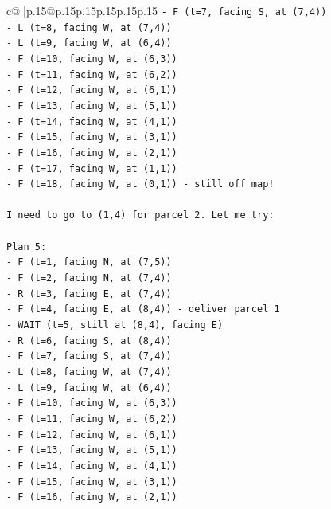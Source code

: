 \documentclass{article}
\begin{document}
{\begin{supertabular}{c@{$\;$}|p{.15\linewidth}@{}p{.15\linewidth}p{.15\linewidth}p{.15\linewidth}p{.15\linewidth}p{.15\linewidth}}
{{{\texttt{{-} F (t=7, facing S, at (7,4))} \\
\texttt{{-} L (t=8, facing W, at (7,4))} \\
\texttt{{-} L (t=9, facing W, at (6,4))} \\
\texttt{{-} F (t=10, facing W, at (6,3))} \\
\texttt{{-} F (t=11, facing W, at (6,2))} \\
\texttt{{-} F (t=12, facing W, at (6,1))} \\
\texttt{{-} F (t=13, facing W, at (5,1))} \\
\texttt{{-} F (t=14, facing W, at (4,1))} \\
\texttt{{-} F (t=15, facing W, at (3,1))} \\
\texttt{{-} F (t=16, facing W, at (2,1))} \\
\texttt{{-} F (t=17, facing W, at (1,1))} \\
\texttt{{-} F (t=18, facing W, at (0,1)) {-} still off map!} \\
\\ 
\texttt{I need to go to (1,4) for parcel 2. Let me try:} \\
\\ 
\texttt{Plan 5:} \\
\texttt{{-} F (t=1, facing N, at (7,5))} \\
\texttt{{-} F (t=2, facing N, at (7,4))} \\
\texttt{{-} R (t=3, facing E, at (7,4))} \\
\texttt{{-} F (t=4, facing E, at (8,4)) {-} deliver parcel 1} \\
\texttt{{-} WAIT (t=5, still at (8,4), facing E)} \\
\texttt{{-} R (t=6, facing S, at (8,4))} \\
\texttt{{-} F (t=7, facing S, at (7,4))} \\
\texttt{{-} L (t=8, facing W, at (7,4))} \\
\texttt{{-} L (t=9, facing W, at (6,4))} \\
\texttt{{-} F (t=10, facing W, at (6,3))} \\
\texttt{{-} F (t=11, facing W, at (6,2))} \\
\texttt{{-} F (t=12, facing W, at (6,1))} \\
\texttt{{-} F (t=13, facing W, at (5,1))} \\
\texttt{{-} F (t=14, facing W, at (4,1))} \\
\texttt{{-} F (t=15, facing W, at (3,1))} \\
\texttt{{-} F (t=16, facing W, at (2,1))} \\
}}}
\end{supertabular}}
\end{document}
